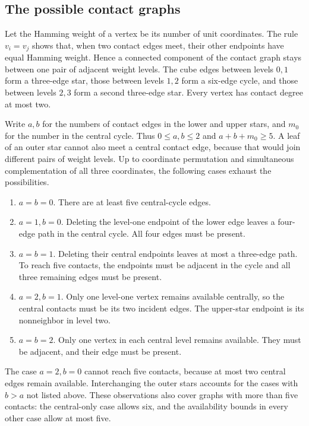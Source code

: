 \subsection{The possible contact graphs}

Let the Hamming weight of a vertex be its number of unit coordinates.
The rule $v_i=v_j$ shows that, when two contact edges meet, their other
endpoints have equal Hamming weight. Hence a connected component of the
contact graph stays between one pair of adjacent weight levels. The cube
edges between levels $0,1$ form a three-edge star, those between levels
$1,2$ form a six-edge cycle, and those between levels $2,3$ form a second
three-edge star. Every vertex has contact degree at most two.

Write $a,b$ for the numbers of contact edges in the lower and upper stars,
and $m_0$ for the number in the central cycle. Thus $0\le a,b\le2$ and
$a+b+m_0\ge5$. A leaf of an outer star cannot also meet a central contact
edge, because that would join different pairs of weight levels. Up to
coordinate permutation and simultaneous complementation of all three
coordinates, the following cases exhaust the possibilities.

\begin{enumerate}[label=(\roman*)]
\item $a=b=0$. There are at least five central-cycle edges.
\item $a=1,b=0$. Deleting the level-one endpoint of the lower edge leaves
      a four-edge path in the central cycle. All four edges must be present.
\item $a=b=1$. Deleting their central endpoints leaves at most a three-edge
      path. To reach five contacts, the endpoints must be adjacent in the
      cycle and all three remaining edges must be present.
\item $a=2,b=1$. Only one level-one vertex remains available centrally, so
      the central contacts must be its two incident edges. The upper-star
      endpoint is its nonneighbor in level two.
\item $a=b=2$. Only one vertex in each central level remains available.
      They must be adjacent, and their edge must be present.
\end{enumerate}
The case $a=2,b=0$ cannot reach five contacts, because at most two central
edges remain available. Interchanging the outer stars accounts for the
cases with $b>a$ not listed above. These observations also cover graphs
with more than five contacts: the central-only case allows six, and the
availability bounds in every other case allow at most five.

